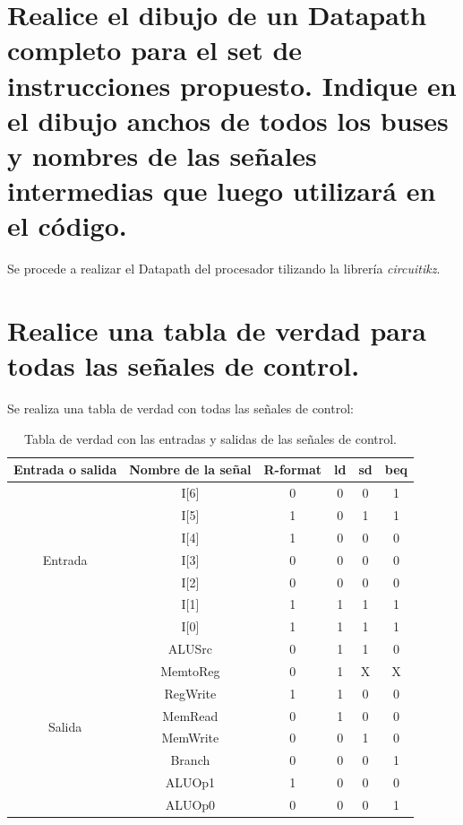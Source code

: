 \documentclass[11pt,a4paper]{article}
\begin{document}
\section{Realice el dibujo de un Datapath completo para el set de instrucciones propuesto.
Indique en el dibujo anchos de todos los buses y nombres de las señales
intermedias que luego utilizará en el código.}

Se procede a realizar el Datapath del procesador tilizando la librería \textit{circuitikz}.


\section{Realice una tabla de verdad para todas las señales de control.}

Se realiza una tabla de verdad con todas las señales de control:

\begin{table}[htbp]
	\centering
	  \begin{tabular}{|c|c|c|c|c|c|}
	  \hline
	  Entrada o salida & Nombre de la señal & R-format & ld & sd & beq \\
	  \hline
	  \multirow{7}{*}{Entrada} & I[6] & 0    & 0    & 0    & 1 \\
  \cline{2-6}         & I[5] & 1    & 0    & 1    & 1 \\
  \cline{2-6}         & I[4] & 1    & 0    & 0    & 0 \\
  \cline{2-6}         & I[3] & 0    & 0    & 0    & 0 \\
  \cline{2-6}         & I[2] & 0    & 0    & 0    & 0 \\
  \cline{2-6}         & I[1] & 1    & 1    & 1    & 1 \\
  \cline{2-6}         & I[0] & 1    & 1    & 1    & 1 \\
	  \hline
	\multirow{8}{*}{Salida} & ALUSrc & 0    & 1    & 1    & 0 \\
  \cline{2-6}         & MemtoReg & 0    & 1    & X & X \\
  \cline{2-6}         & RegWrite & 1    & 1    & 0    & 0 \\
  \cline{2-6}         & MemRead & 0    & 1    & 0    & 0 \\
  \cline{2-6}         & MemWrite & 0    & 0    & 1    & 0 \\
  \cline{2-6}         & Branch & 0    & 0    & 0    & 1 \\
  \cline{2-6}         & ALUOp1 & 1    & 0    & 0    & 0 \\
  \cline{2-6}         & ALUOp0 & 0    & 0    & 0    & 1 \\
	  \hline
	  \end{tabular}%
	  \caption{Tabla de verdad con las entradas y salidas de las señales de control.}
	\label{tab:addlabel}%
  \end{table}%
  
\end{document}
